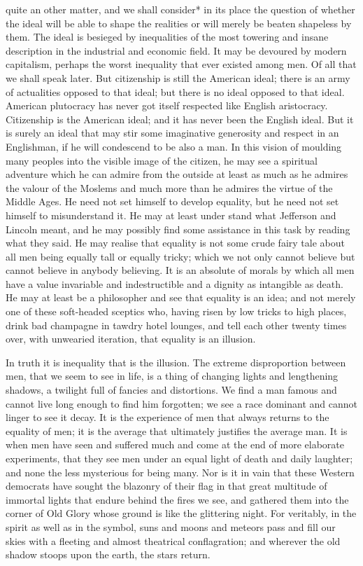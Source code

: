 \documentclass{book}
\begin{document}
quite an other matter, and we shall consider* in its place the question of whether the ideal will be able to shape the realities or will merely be beaten shapeless by them. The ideal is besieged by inequalities of the most towering and insane description in the industrial and economic field. It may be devoured by modern capitalism, perhaps the worst inequality that ever existed among men. Of all that we shall speak later. But citizenship is still the American ideal; there is an army of actualities opposed to that ideal; but there is no ideal opposed to that ideal. American plutocracy has never got itself respected like English aristocracy. Citizenship is the American ideal; and it has never been the English ideal. But it is surely an ideal that may stir some imaginative generosity and respect in an Englishman, if he will condescend to be also a man. In this vision of moulding many peoples into the visible image of the citizen, he may see a spiritual adventure which he can admire from the outside at least as much as he admires the valour of the Moslems and much more than he admires the virtue of the Middle Ages. He need not set himself to develop equality, but he need not set himself to misunderstand it. He may at least under stand what Jefferson and Lincoln meant, and he may possibly find some assistance in this task by reading what they said. He may realise that equality is not some crude fairy tale about all men being equally tall or equally tricky; which we not only cannot believe but cannot believe in anybody believing. It is an absolute of morals by which all men have a value invariable and indestructible and a dignity as intangible as death. He may at least be a philosopher and see that equality is an idea; and not merely one of these soft-headed sceptics who, having risen by low tricks to high places, drink bad champagne in tawdry hotel lounges, and tell each other twenty times over, with unwearied iteration, that equality is an illusion.

In truth it is inequality that is the illusion. The extreme disproportion between men, that we seem to see in life, is a thing of changing lights and lengthening shadows, a twilight full of fancies and distortions. We find a man famous and cannot live long enough to find him forgotten; we see a race dominant and cannot linger to see it decay. It is the experience of men that always returns to the equality of men; it is the average that ultimately justifies the average man. It is when men have seen and suffered much and come at the end of more elaborate experiments, that they see men under an equal light of death and daily laughter; and none the less mysterious for being many. Nor is it in vain that these Western democrats have sought the blazonry of their flag in that great multitude of immortal lights that endure behind the fires we see, and gathered them into the corner of Old Glory whose ground is like the glittering night. For veritably, in the spirit as well as in the symbol, suns and moons and meteors pass and fill our skies with a fleeting and almost theatrical conflagration; and wherever the old shadow stoops upon the earth, the stars return.
\end{document}

